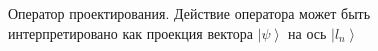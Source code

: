 \begin{figure}
\centering



\caption{Оператор проектирования. Действие оператора может быть
  интерпретировано как проекция вектора $\left|\psi\right>$ на ось $\left|l_n\right>$}
\label{figAddProject}
\end{figure}
